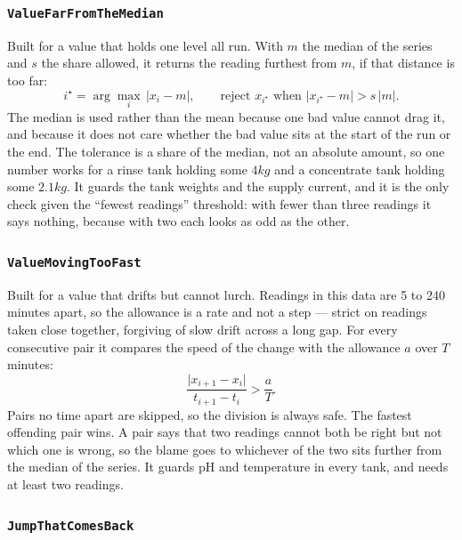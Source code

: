 \subsubsection*{\texttt{ValueFarFromTheMedian}}

Built for a value that holds one level all run. With $m$ the median of the series and $s$ the
share allowed, it returns the reading furthest from $m$, if that distance is too far:
\begin{equation}
  \label{eq:far-from-median}
  i^\star = \arg\max_i\,\lvert x_i - m\rvert,
  \qquad
  \text{reject } x_{i^\star} \text{ when } \lvert x_{i^\star} - m\rvert > s\,\lvert m\rvert.
\end{equation}
The median is used rather than the mean because one bad value cannot drag it, and because it
does not care whether the bad value sits at the start of the run or the end. The tolerance is a
share of the median, not an absolute amount, so one number works for a rinse tank holding some
$4\unit{kg}$ and a concentrate tank holding some $2.1\unit{kg}$. It guards the tank weights and
the supply current, and it is the only check given the ``fewest readings'' threshold: with
fewer than three readings it says nothing, because with two each looks as odd as the other.

\subsubsection*{\texttt{ValueMovingTooFast}}

Built for a value that drifts but cannot lurch. Readings in this data are 5 to 240 minutes
apart, so the allowance is a rate and not a step --- strict on readings taken close together,
forgiving of slow drift across a long gap. For every consecutive pair it compares the speed of
the change with the allowance $a$ over $T$ minutes:
\begin{equation}
  \label{eq:moving-too-fast}
  \frac{\lvert x_{i+1} - x_i\rvert}{t_{i+1} - t_i} > \frac{a}{T}.
\end{equation}
Pairs no time apart are skipped, so the division is always safe. The fastest offending pair
wins. A pair says that two readings cannot both be right but not which one is wrong, so the
blame goes to whichever of the two sits further from the median of the series. It guards pH and
temperature in every tank, and needs at least two readings.

\subsubsection*{\texttt{JumpThatComesBack}}

